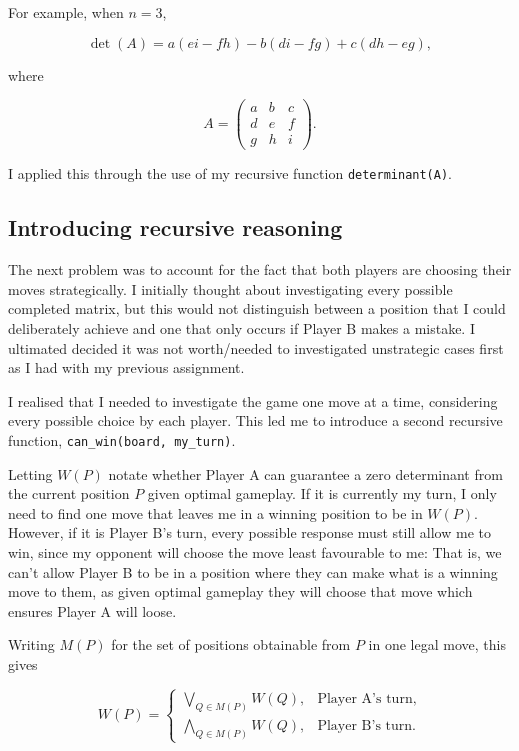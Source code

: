 \documentclass[11pt]{article}
\newcommand{\keywordfont}{\textsc}
\newcommand{\keyword}[1]{%
  \marginpar{\raggedright\small\keywordfont{#1}}}
\begin{document}
For example, when $n=3$,

$$
\det(A)=a(ei-fh)-b(di-fg)+c(dh-eg),
$$

where

$$
A=\begin{pmatrix}
a&b&c\\
d&e&f\\
g&h&i
\end{pmatrix}.
$$

I applied this through the use of my recursive function \texttt{determinant(A)}.

\subsection*{Introducing recursive reasoning}

The next problem was to account for the fact that both players are choosing their moves strategically. I initially thought about investigating every possible completed matrix, but this would not distinguish between a position that I could deliberately achieve and one that only occurs if Player B makes a mistake. I ultimated decided it was not worth/needed to investigated unstrategic cases first as I had with my previous assignment.

\keyword{AHA} I realised that I needed to investigate the game one move at a time, considering every possible choice by each player. This led me to introduce a second recursive function, \texttt{can\_win(board, my\_turn)}.

Letting $W(P)$ notate whether Player A can guarantee a zero determinant from the current position $P$ given optimal gameplay. If it is currently my turn, I only need to find one move that leaves me in a winning position to be in $W(P)$. However, if it is Player B's turn, every possible response must still allow me to win, since my opponent will choose the move least favourable to me: That is, we can't allow Player B to be in a position where they can make what is a winning move to them, as given optimal gameplay they will choose that move which ensures Player A will loose.

Writing $M(P)$ for the set of positions obtainable from $P$ in one legal move, this gives


$$
W(P)=
\begin{cases}
\displaystyle\bigvee_{Q\in M(P)}W(Q),
&\text{Player A's turn},\\[8pt]
\displaystyle\bigwedge_{Q\in M(P)}W(Q),
&\text{Player B's turn}.
\end{cases}
$$
\end{document}

